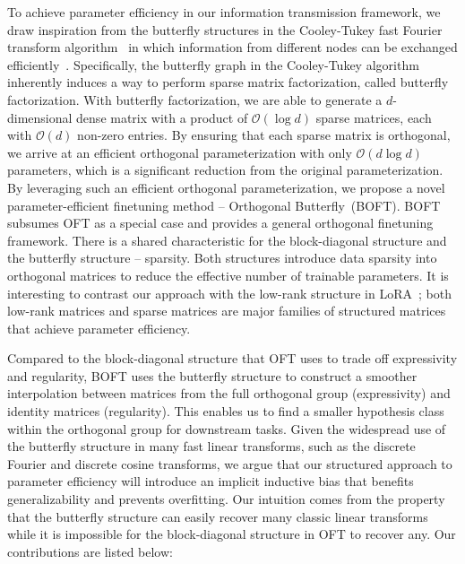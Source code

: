 To achieve parameter efficiency in our information transmission framework, we draw inspiration from the butterfly structures in the Cooley-Tukey fast Fourier transform algorithm~\cite{cooley1965algorithm} in which information from different nodes can be exchanged efficiently~\cite{klasing1994broadcasting}. Specifically, the butterfly graph in the Cooley-Tukey algorithm inherently induces a way to perform sparse matrix factorization, called butterfly factorization. With butterfly factorization, we are able to generate a $d$-dimensional dense matrix with a product of $\mathcal{O}(\log d)$ sparse matrices, each with $\mathcal{O}(d)$ non-zero entries. By ensuring that each sparse matrix is orthogonal, we arrive at an efficient orthogonal parameterization with only $\mathcal{O}(d\log d)$  parameters, which is a significant reduction from the original parameterization. By leveraging such an efficient orthogonal parameterization, we propose a novel parameter-efficient finetuning method -- Orthogonal Butterfly~(BOFT). BOFT subsumes OFT as a special case and provides a general orthogonal finetuning framework. There is a shared characteristic for the block-diagonal structure and the butterfly structure -- sparsity. Both structures introduce data sparsity into orthogonal matrices to reduce the effective number of trainable parameters.  It is interesting to   contrast our approach with the low-rank structure in LoRA~\cite{hulora2022};  both low-rank matrices and sparse matrices are major families of structured matrices~\cite{candes2011robust} that achieve parameter efficiency. 

Compared to the block-diagonal structure that OFT uses to trade off expressivity and regularity, BOFT uses the butterfly structure to construct a smoother interpolation between matrices from the full orthogonal group (expressivity) and identity matrices (regularity). This enables us to find a smaller hypothesis class within the orthogonal group for downstream tasks. Given the widespread use of the butterfly structure in many fast linear transforms, such as the discrete Fourier and discrete cosine transforms, we argue that our structured approach to parameter efficiency will introduce an implicit inductive bias that benefits generalizability and prevents overfitting. Our intuition comes from the property that the butterfly structure can easily recover many classic linear transforms while it is impossible for the block-diagonal structure in OFT to recover any. Our contributions are listed below:

